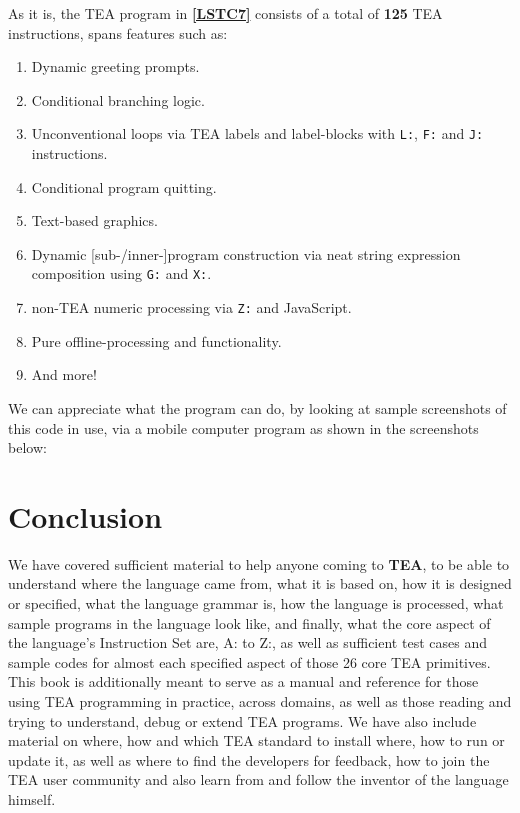 \documentclass[a4paper, 18pt]{book} %
\begin{document}
  \label{FIGC7}
  \vspace{1cm}
  
  
  As it is, the TEA program in \textbf{\autoref{LSTC7}} consists of a total of \textbf{125} TEA instructions, spans features such as:
  
\begin{enumerate}
\item Dynamic greeting prompts.
\item Conditional branching logic.
\item Unconventional loops via TEA labels and label-blocks with \texttt{L:}, \texttt{F:} and \texttt{J:} instructions.
\item Conditional program quitting.
\item Text-based graphics.
\item Dynamic [sub-/inner-]program construction via neat string expression composition using \texttt{G:} and \texttt{X:}.
\item non-TEA numeric processing via \texttt{Z:} and JavaScript.
\item Pure offline-processing and functionality.
\item And more!
\end{enumerate} 
 

We can appreciate what the program can do, by looking at sample screenshots of this code in use, via a mobile computer program as shown in the screenshots below:




\chapter{Conclusion}
\label{SECCONC}



We have covered sufficient material to help anyone coming to \textbf{TEA}, to be able to understand where the language came from, what it is based on, how it is designed or specified, what the language grammar is, how the language is processed, what sample programs in the language look like, and finally, what the core aspect of the language's Instruction Set are, A: to Z:, as well as sufficient test cases and sample codes for almost each specified aspect of those 26 core TEA primitives. This book is additionally meant to serve as a manual and reference for those using TEA programming in practice, across domains, as well as those reading and trying to understand, debug or extend TEA programs. We have also include material on where, how and which TEA standard to install where, how to run or update it, as well as where to find the developers for feedback, how to join the TEA user community and also learn from and follow the inventor of the language himself.
\end{document}
